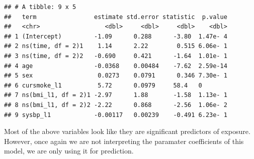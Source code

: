 \documentclass[
]{book}
\newenvironment{Shaded}{\begin{snugshade}}{\end{snugshade}}
\newcommand{\CommentTok}[1]{\textcolor[rgb]{0.56,0.35,0.01}{\textit{#1}}}
\newcommand{\DataTypeTok}[1]{\textcolor[rgb]{0.13,0.29,0.53}{#1}}
\newcommand{\DecValTok}[1]{\textcolor[rgb]{0.00,0.00,0.81}{#1}}
\newcommand{\KeywordTok}[1]{\textcolor[rgb]{0.13,0.29,0.53}{\textbf{#1}}}
\newcommand{\NormalTok}[1]{#1}
\newcommand{\OperatorTok}[1]{\textcolor[rgb]{0.81,0.36,0.00}{\textbf{#1}}}
\newcommand{\StringTok}[1]{\textcolor[rgb]{0.31,0.60,0.02}{#1}}
\begin{document}
\begin{verbatim}
## # A tibble: 9 x 5
##   term                estimate std.error statistic  p.value
##   <chr>                  <dbl>     <dbl>     <dbl>    <dbl>
## 1 (Intercept)         -1.09      0.288      -3.80  1.47e- 4
## 2 ns(time, df = 2)1    1.14      2.22        0.515 6.06e- 1
## 3 ns(time, df = 2)2   -0.690     0.421      -1.64  1.01e- 1
## 4 age                 -0.0368    0.00484    -7.62  2.59e-14
## 5 sex                  0.0273    0.0791      0.346 7.30e- 1
## 6 cursmoke_l1          5.72      0.0979     58.4   0       
## 7 ns(bmi_l1, df = 2)1 -2.97      1.88       -1.58  1.13e- 1
## 8 ns(bmi_l1, df = 2)2 -2.22      0.868      -2.56  1.06e- 2
## 9 sysbp_l1            -0.00117   0.00239    -0.491 6.23e- 1
\end{verbatim}

Most of the above variables look like they are significant predictors of exposure. However, once again we are not interpreting the paramater coefficients of this model, we are only using it for prediction.

\begin{Shaded}
\end{Shaded}
\end{document}
